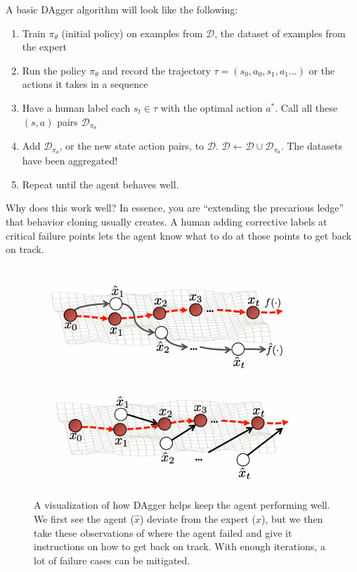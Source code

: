     A basic DAgger algorithm will look like the following:
    \begin{enumerate}
        \item Train $\pi_\theta$ (initial policy) on examples from $\mathcal{D}$, the dataset of examples from the expert
        \item Run the policy $\pi_\theta$ and record the trajectory $\tau = (s_0, a_0, s_1, a_1...)$ or the actions it takes in a sequence
        \item Have a human label each $s_t \in \tau$ with the optimal action $a^\ast$. Call all these $(s, a)$ pairs $\mathcal{D}_{\pi_\theta}$
        \item Add $\mathcal{D}_{\pi_\theta}$, or the new state action pairs, to $\mathcal{D}$. $\mathcal{D} \leftarrow \mathcal{D} \cup \mathcal{D}_{\pi_\theta}$. The datasets have been aggregated!
        \item Repeat until the agent behaves well.
    \end{enumerate}

    Why does this work well? In essence, you are ``extending the precarious ledge'' that behavior cloning usually creates. A human adding corrective labels at critical failure points lets the agent know what to do at those points to get back on track.

    \begin{figure}[H]
        \centering
        \includegraphics[width=0.7\linewidth]{rl/daggerviz.png}
        \caption{A visualization of how DAgger helps keep the agent performing well. We first see the agent ($\hat{x}$) deviate from the expert ($x$), but we then take these observations of where the agent failed and give it instructions on how to get back on track. With enough iterations, a lot of failure cases can be mitigated.}
        \label{fig:daggerviz}
    \end{figure}

